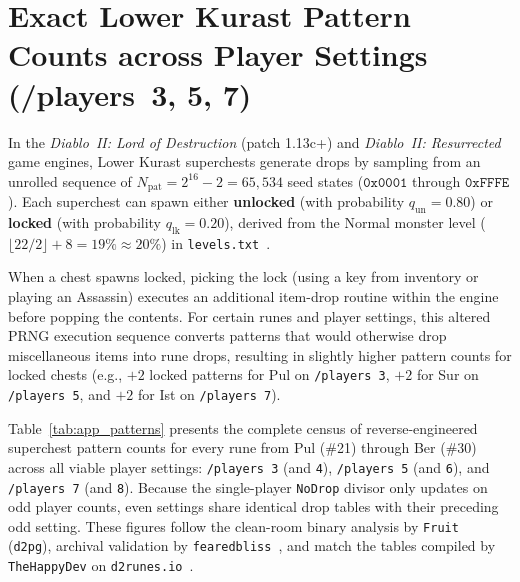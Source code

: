 \documentclass[11pt,reqno]{amsart}
\theoremstyle{definition}
\begin{document}
\appendix

\section{Exact Lower Kurast Pattern Counts across Player Settings (/players~3, 5, 7)}
\label{app:patterns}

In the \emph{Diablo~II: Lord of Destruction} (patch 1.13c+) and \emph{Diablo~II: Resurrected} game engines, Lower Kurast superchests generate drops by sampling from an unrolled sequence of $N_{\text{pat}} = 2^{16} - 2 = 65{,}534$ seed states ($\mathtt{0x0001}$ through $\mathtt{0xFFFE}$). Each superchest can spawn either \textbf{unlocked} (with probability $q_{\text{un}} = 0.80$) or \textbf{locked} (with probability $q_{\text{lk}} = 0.20$), derived from the Normal monster level ($\lfloor 22/2 \rfloor + 8 = 19\% \approx 20\%$) in \texttt{levels.txt}~\cite{nefarius_levels}.

When a chest spawns locked, picking the lock (using a key from inventory or playing an Assassin) executes an additional item-drop routine within the engine before popping the contents. For certain runes and player settings, this altered PRNG execution sequence converts patterns that would otherwise drop miscellaneous items into rune drops, resulting in slightly higher pattern counts for locked chests (e.g., $+2$ locked patterns for Pul on \texttt{/players~3}, $+2$ for Sur on \texttt{/players~5}, and $+2$ for Ist on \texttt{/players~7}).

Table~\ref{tab:app_patterns} presents the complete census of reverse-engineered superchest pattern counts for every rune from Pul (\#21) through Ber (\#30) across all viable player settings: \texttt{/players~3} (and \texttt{4}), \texttt{/players~5} (and \texttt{6}), and \texttt{/players~7} (and \texttt{8}). Because the single-player \texttt{NoDrop} divisor only updates on odd player counts, even settings share identical drop tables with their preceding odd setting. These figures follow the clean-room binary analysis by \texttt{Fruit}~\cite{fruit_d2pg} (\texttt{d2pg}), archival validation by \texttt{fearedbliss}~\cite{fearedbliss_lk}, and match the tables compiled by \texttt{TheHappyDev} on \texttt{d2runes.io}~\cite{thehappydev_d2runes}.
\end{document}
